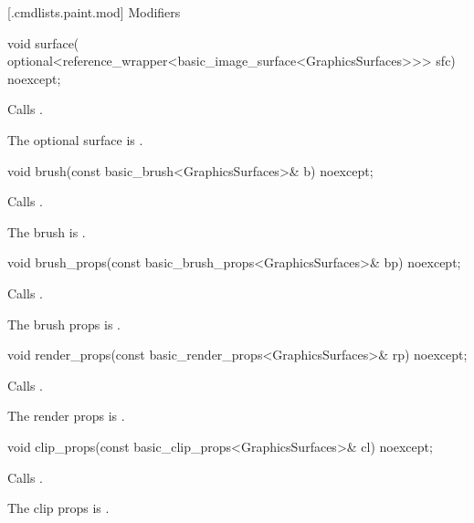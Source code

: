  [\iotwod.cmdlists.paint.mod] {Modifiers}%

%
\begin{itemdecl}
void surface(
  optional<reference_wrapper<basic_image_surface<GraphicsSurfaces>>> sfc) 
  noexcept;
\end{itemdecl}
\begin{itemdescr}
\pnum
\effects Calls .

\pnum
\remarks The optional surface is .
\end{itemdescr}

%
\begin{itemdecl}
void brush(const basic_brush<GraphicsSurfaces>& b) noexcept;
\end{itemdecl}
\begin{itemdescr}
\pnum
\effects Calls .

\pnum
\remarks The brush is .
\end{itemdescr}

%
\begin{itemdecl}
void brush_props(const basic_brush_props<GraphicsSurfaces>& bp) noexcept;
\end{itemdecl}
\begin{itemdescr}
\pnum
\effects Calls .

\pnum
\remarks The brush props is .
\end{itemdescr}

%
\begin{itemdecl}
void render_props(const basic_render_props<GraphicsSurfaces>& rp) noexcept;
\end{itemdecl}
\begin{itemdescr}
\pnum
\effects Calls .

\pnum
\remarks The render props is .
\end{itemdescr}

%
\begin{itemdecl}
void clip_props(const basic_clip_props<GraphicsSurfaces>& cl) noexcept;
\end{itemdecl}
\begin{itemdescr}
\pnum
\effects Calls .

\pnum
\remarks The clip props is .
\end{itemdescr}

